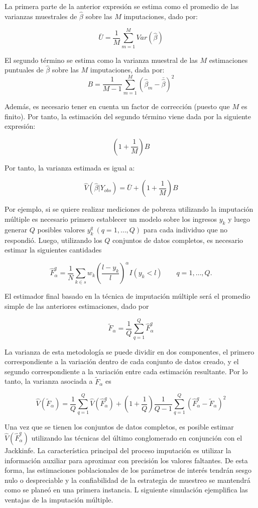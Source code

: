 \documentclass[
  12pt,
]{book}
\begin{document}
La primera parte de la anterior expresión se estima como el promedio de las varianzas muestrales de \(\hat{\beta}\) sobre las \(M\) imputaciones, dado por:

\[
\bar{U} = \frac{1}{M} \sum_{m = 1} ^ M Var(\hat{\beta})
\]

El segundo término se estima como la varianza muestral de las \(M\) estimaciones puntuales de \(\hat{\beta}\) sobre las \(M\) imputaciones, dada por:
\[
B = \frac{1}{M-1} \sum_{m = 1} ^ M (\hat{\beta}_m - \bar{\hat{\beta}})^2
\]

Además, es necesario tener en cuenta un factor de corrección (puesto que \(M\) es finito). Por tanto, la estimación del segundo término viene dada por la siguiente expresión:

\[
\left(1 + \frac{1}{M}\right) B
\]

Por tanto, la varianza estimada es igual a:

\[
\hat{V}(\hat{\beta} | Y_{obs}) = \bar{U} + \left(1 + \frac{1}{M}\right) B
\]

Por ejemplo, si se quiere realizar mediciones de pobreza utilizando la imputación múltiple es necesario primero establecer un modelo sobre los ingresos \(y_k\) y luego generar \(Q\) posibles valores \(y_k^q \ (q=1, \ldots, Q)\) para cada individuo que no respondió. Luego, utilizando los \(Q\) conjuntos de datos completos, es necesario estimar la siguientes cantidades

\[
\hat{F}_{\alpha}^{q}=\frac{1}{N}\sum_{k\in s} w_k 
\left(\frac{l-y_k}{l}\right)^{\alpha}I(y_k<l) \ \ \ \ \ \ \ \ \ 
q= 1,\ldots, Q.
\]

El estimador final basado en la técnica de imputación múltiple será el promedio simple de las anteriores estimaciones, dado por

\[
\tilde{F}_{\alpha}=\frac{1}{Q}\sum_{q=1}^Q \hat{F}_{\alpha}^{q}
\]

La varianza de esta metodología se puede dividir en dos componentes, el primero correspondiente a la variación dentro de cada conjunto de datos creado, y el segundo correspondiente a la variación entre cada estimación resultante. Por lo tanto, la varianza asociada a \(\tilde{F}_{\alpha}\) es

\[
\hat{V}(\tilde{F}_{\alpha})
= \frac{1}{Q}\sum_{q=1}^Q \hat{V}(\hat{F}_{\alpha}^{q})
+ \left(1+\frac{1}{Q}\right)\frac{1}{Q-1}\sum_{q=1}^Q (\hat{F}_{\alpha}^{q}-\tilde{F}_{\alpha})^2
\]

Una vez que se tienen los conjuntos de datos completos, es posible estimar \(\hat{V}(\hat{F}_{\alpha}^{q})\) utilizando las técnicas del último conglomerado en conjunción con el Jackkinfe. La característica principal del proceso imputación es utilizar la información auxiliar para aproximar con precisión los valores faltantes. De esta forma, las estimaciones poblacionales de los parámetros de interés tendrán sesgo nulo o despreciable y la confiabilidad de la estrategia de muestreo se mantendrá como se planeó en una primera instancia. L siguiente simulación ejemplifica las ventajas de la imputación múltiple.
\end{document}

